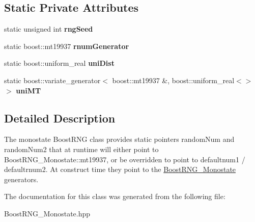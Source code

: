 \subsection*{Static Private Attributes}
\begin{DoxyCompactItemize}
\item 
static unsigned int {\bfseries rng\+Seed}\label{classPecos_1_1BoostRNG__Monostate_a9411e7020b48b5f4bda9454ebd58dac2}

\item 
static boost\+::mt19937 {\bfseries rnum\+Generator}\label{classPecos_1_1BoostRNG__Monostate_ac1eae1eea544fd3712ae5a8d62724ddf}

\item 
static boost\+::uniform\+\_\+real {\bfseries uni\+Dist}\label{classPecos_1_1BoostRNG__Monostate_aeb12dfc2fa20445c0bc97650b4b91877}

\item 
static boost\+::variate\+\_\+generator$<$ boost\+::mt19937 \&, boost\+::uniform\+\_\+real$<$$>$ $>$ {\bfseries uni\+MT}\label{classPecos_1_1BoostRNG__Monostate_a5ec148ef3f4bea4dfdfdf3f24e2094c7}

\end{DoxyCompactItemize}


\subsection{Detailed Description}
The monostate Boost\+R\+NG class provides static pointers random\+Num and random\+Num2 that at runtime will either point to Boost\+R\+N\+G\+\_\+\+Monostate\+::mt19937, or be overridden to point to defaultnum1 / defaultrnum2. At construct time they point to the \hyperlink{classPecos_1_1BoostRNG__Monostate}{Boost\+R\+N\+G\+\_\+\+Monostate} generators. 

The documentation for this class was generated from the following file\+:\begin{DoxyCompactItemize}
\item 
Boost\+R\+N\+G\+\_\+\+Monostate.\+hpp\end{DoxyCompactItemize}
